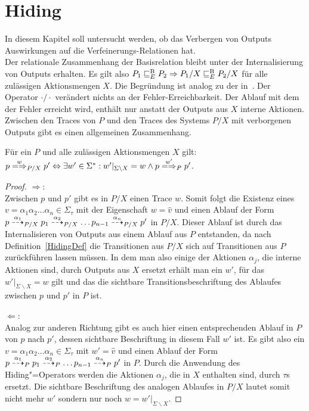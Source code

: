 \section{Hiding}

In diesem Kapitel soll untersucht werden, ob das Verbergen von Outputs
Auswirkungen auf die Verfeinerungs-Relationen \ERel{} hat.\\
Der relationale Zusammenhang der Basisrelation \EBRel{} bleibt unter der
Internalisierung von Outputs erhalten. Es gilt also $P_1 \sqsubseteq  _E^\mathrm{B} P_2 \Rightarrow
P_1/X \sqsubseteq  _E^\mathrm{B} P_2/X$ für alle zulässigen Aktionsmengen $X$. Die Begründung ist
analog zu der in~\cite{Schinko2016BA}. Der Operator $\cdot /\cdot$ verändert
nichts an der Fehler-Erreichbarkeit. Der Ablauf mit dem der Fehler erreicht
wird, enthält nur anstatt der Outputs aus $X$ interne Aktionen.\\
Zwischen den Traces von $P$ und den Traces des Systems $P/X$ mit verborgenen
Outputs gibt es einen allgemeinen Zusammenhang.

\begin{Lem}
  \label{TraceHidingLem}
  Für ein \MEIO{} $P$ und alle zulässigen Aktionsmengen $X$ gilt: $p
  \weakmay[w]_{P/X} p' \Leftrightarrow \exists w'\in \Sigma ^*:
  w'|_{\Sigma\backslash X} = w \land p \weakmay[w']_P p'$.
\end{Lem}
\begin{proof}
  \glqq $\Rightarrow$\grqq{}:\\
  Zwischen $p$ und $p'$ gibt es in $P/X$ einen Trace $w$. Somit folgt die
  Existenz eines $v=\alpha _1\alpha_2\dots\alpha _n\in\Sigma _{\tau}$ mit der
  Eigenschaft $w = \hat{v}$ und einen Ablauf der Form $p \may[\alpha _1]_{P/X}
  p_1 \may[\alpha _2]_{P/X} \dots p_{n-1} \may[\alpha _n]_{P/X} p'$ in $P/X$.
  Dieser Ablauf ist durch das Internalisieren von Outputs aus einem Ablauf aus
  $P$ entstanden, da nach Definition~\ref{HidingDef} die Transitionen aus $P/X$
  sich auf Transitionen aus $P$ zurückführen lassen müssen. In dem man also
  einige der Aktionen $\alpha_j$, die interne Aktionen sind, durch Outputs aus
  $X$ ersetzt erhält man ein $w'$, für das $w'|_{\Sigma\backslash X}=w$ gilt
  und das die sichtbare Transitionsbeschriftung des Ablaufes zwischen $p$ und
  $p'$ in $P$ ist.

  \glqq $\Leftarrow$\grqq{}:\\
  Analog zur anderen Richtung gibt es auch hier einen entsprechenden Ablauf in
  $P$ von $p$ nach $p'$, dessen sichtbare Beschriftung in diesem Fall $w'$ ist.
  Es gibt also ein $v=\alpha _1\alpha_2\dots\alpha _n\in\Sigma _{\tau}$ mit $w'
  = \hat{v}$ und einen Ablauf der Form $p \may[\alpha _1]_P p_1 \may[\alpha
  _2]_P \dots p_{n-1} \may[\alpha _n]_P p'$ in $P$. Durch die Anwendung des
  Hiding"=Operators werden die Aktionen $\alpha _j$, die in $X$ enthalten sind,
  durch $\tau$s ersetzt. Die sichtbare Beschriftung des analogen Ablaufes in
  $P/X$ lautet somit nicht mehr $w'$ sondern nur noch $w =
  w'|_{\Sigma\backslash X}$.
\end{proof}

